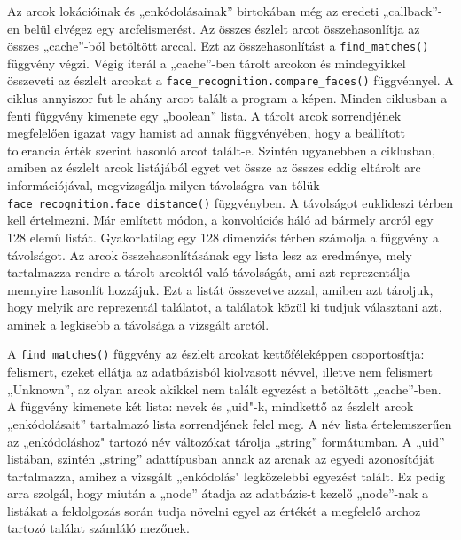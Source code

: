 Az arcok lokációinak és „enkódolásainak” birtokában még az eredeti „callback”-en belül elvégez egy arcfelismerést. Az összes észlelt arcot összehasonlítja az összes „cache”-ből betöltött arccal. Ezt az összehasonlítást a \verb|find_matches()| függvény végzi. Végig iterál a „cache”-ben tárolt arcokon és mindegyikkel összeveti az észlelt arcokat a \verb|face_recognition.compare_faces()| függvénnyel. A ciklus annyiszor fut le ahány arcot talált a program a képen. Minden ciklusban a fenti függvény kimenete egy „boolean” lista. A tárolt arcok sorrendjének megfelelően igazat vagy hamist ad annak függvényében, hogy a beállított tolerancia érték szerint hasonló arcot talált-e. Szintén ugyanebben a ciklusban, amiben az észlelt arcok listájából egyet vet össze az összes eddig eltárolt arc információjával, megvizsgálja milyen távolságra van tőlük \verb|face_recognition.face_distance()| függvényben. A távolságot euklideszi térben kell értelmezni. Már említett módon, a konvolúciós háló ad bármely arcról egy 128 elemű listát. Gyakorlatilag egy 128 dimenziós térben számolja a függvény a távolságot. Az arcok összehasonlításának egy lista lesz az eredménye, mely tartalmazza rendre a tárolt arcoktól való távolságát, ami azt reprezentálja mennyire hasonlít hozzájuk. Ezt a listát összevetve azzal, amiben azt tároljuk, hogy melyik arc reprezentál találatot, a találatok közül ki tudjuk választani azt, aminek a legkisebb a távolsága a vizsgált arctól.

A \verb|find_matches()| függvény az észlelt arcokat kettőféleképpen csoportosítja: felismert, ezeket ellátja az adatbázisból kiolvasott névvel, illetve nem felismert „Unknown”, az olyan arcok akikkel nem talált egyezést a betöltött „cache”-ben. A függvény kimenete két lista: nevek és „uid"-k, mindkettő az észlelt arcok „enkódolásait” tartalmazó lista sorrendjének felel meg. A név lista értelemszerűen az „enkódoláshoz" tartozó név változókat tárolja „string” formátumban. A „uid” listában, szintén „string” adattípusban annak az arcnak az egyedi azonosítóját tartalmazza, amihez a vizsgált „enkódolás" legközelebbi egyezést talált. Ez pedig arra szolgál, hogy miután a „node” átadja az adatbázis-t kezelő „node”-nak a listákat a feldolgozás során tudja növelni egyel az értékét a megfelelő archoz tartozó találat számláló mezőnek.

